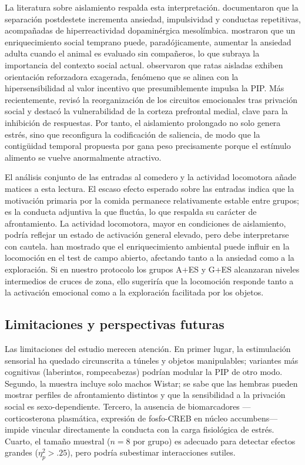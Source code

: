 \documentclass[12pt,a4paper]{article}
\begin{document}
\begin{multicols}{2}
La literatura sobre aislamiento respalda esta interpretación. \citet{Fone2008} documentaron que la separación postdestete incrementa ansiedad, impulsividad y conductas repetitivas, acompañadas de hiperreactividad dopaminérgica mesolímbica. \citet{Branchi2006} mostraron que un enriquecimiento social temprano puede, paradójicamente, aumentar la ansiedad adulta cuando el animal es evaluado sin compañeros, lo que subraya la importancia del contexto social actual. \citet{Robbins1989} observaron que ratas aisladas exhiben orientación reforzadora exagerada, fenómeno que se alinea con la hipersensibilidad al valor incentivo que presumiblemente impulsa la PIP. Más recientemente, \citet{Arakawa2018} revisó la reorganización de los circuitos emocionales tras privación social y destacó la vulnerabilidad de la corteza prefrontal medial, clave para la inhibición de respuestas. Por tanto, el aislamiento prolongado no solo genera estrés, sino que reconfigura la codificación de saliencia, de modo que la contigüidad temporal propuesta por \citet{Killeen2013} gana peso precisamente porque el estímulo alimento se vuelve anormalmente atractivo.

El análisis conjunto de las entradas al comedero y la actividad locomotora añade matices a esta lectura. El escaso efecto esperado sobre las entradas indica que la motivación primaria por la comida permanece relativamente estable entre grupos; es la conducta adjuntiva la que fluctúa, lo que respalda su carácter de afrontamiento. La actividad locomotora, mayor en condiciones de aislamiento, podría reflejar un estado de activación general elevado, pero debe interpretarse con cautela. \citet{seibenhener2015use} han mostrado que el enriquecimiento ambiental puede influir en la locomoción en el test de campo abierto, afectando tanto a la ansiedad como a la exploración. Si en nuestro protocolo los grupos A+ES y G+ES alcanzaran niveles intermedios de cruces de zona, ello sugeriría que la locomoción responde tanto a la activación emocional como a la exploración facilitada por los objetos.

\subsection*{Limitaciones y perspectivas futuras}

Las limitaciones del estudio merecen atención. En primer lugar, la estimulación sensorial ha quedado circunscrita a túneles y objetos manipulables; variantes más cognitivas (laberintos, rompecabezas) podrían modular la PIP de otro modo. Segundo, la muestra incluye solo machos Wistar; se sabe que las hembras pueden mostrar perfiles de afrontamiento distintos y que la sensibilidad a la privación social es sexo-dependiente. Tercero, la ausencia de biomarcadores —corticosterona plasmática, expresión de fosfo-CREB en núcleo accumbens— impide vincular directamente la conducta con la carga fisiológica de estrés. Cuarto, el tamaño muestral ($n = 8$ por grupo) es adecuado para detectar efectos grandes ($\eta^2_p > .25$), pero podría subestimar interacciones sutiles.


\end{multicols}
\end{document}
